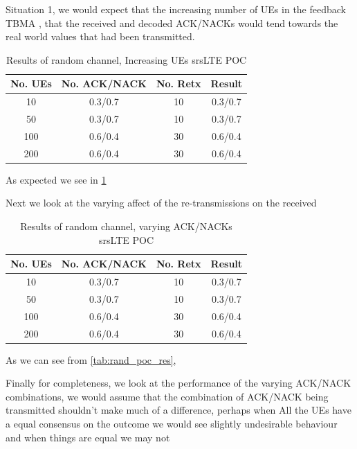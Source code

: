 \documentclass{article}
\begin{document}
Situation 1, we would expect that the increasing number of UEs in the feedback TBMA , that the received and decoded ACK/NACKs would tend towards the real world values that had been transmitted. 

\begin{table}[H]
    \centering
 \begin{tabular}{||c c c c||} 
 \hline
 No. UEs & No. ACK/NACK & No. Retx & Result \\ [0.5ex] 
 \hline\hline
 10 & 0.3/0.7 & 10 &  0.3/0.7 \\ 
 \hline
 50 & 0.3/0.7 & 10 & 0.3/0.7 \\
 \hline
 100 & 0.6/0.4 & 30 & 0.6/0.4 \\
 \hline
 200 & 0.6/0.4 & 30 & 0.6/0.4 \\ [1ex] 
 \hline
\end{tabular}
    \caption{Results of random channel, Increasing UEs srsLTE POC}
    \label{tab:rand_chan_UEs_increase}
\end{table}

As expected we see in \cref{tab:rand_chan_UEs_increase}


Next we look at the varying affect of the re-transmissions on the received 

\begin{table}[H]
    \centering
 \begin{tabular}{||c c c c||} 
 \hline
 No. UEs & No. ACK/NACK & No. Retx & Result \\ [0.5ex] 
 \hline\hline
 10 & 0.3/0.7 & 10 &  0.3/0.7 \\ 
 \hline
 50 & 0.3/0.7 & 10 & 0.3/0.7 \\
 \hline
 100 & 0.6/0.4 & 30 & 0.6/0.4 \\
 \hline
 200 & 0.6/0.4 & 30 & 0.6/0.4 \\ [1ex] 
 \hline
\end{tabular}
    \caption{Results of random channel, varying ACK/NACKs srsLTE POC}
    \label{tab:rand_chan_rtx_increase}
\end{table}

As we can see from \cref{tab:rand_poc_res}, 

Finally for completeness, we look at the performance of the varying ACK/NACK combinations, we would assume that the combination of ACK/NACK being transmitted shouldn't make much of a difference, perhaps when All the UEs have a equal consensus on the outcome we would see slightly undesirable behaviour and when things are equal we may not 
\end{document}
